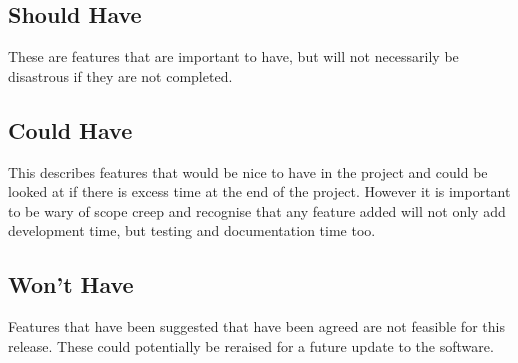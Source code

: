 \subsection{Should Have}
These are features that are important to have, but will not necessarily be disastrous if they are not completed.

\subsection{Could Have}
This describes features that would be nice to have in the project and could be looked at if there is excess time at the end of the project.
However it is important to be wary of scope creep and recognise that any feature added will not only add development time, but testing and documentation time too.

\subsection{Won't Have}
Features that have been suggested that have been agreed are not feasible for this release.
These could potentially be reraised for a future update to the software.